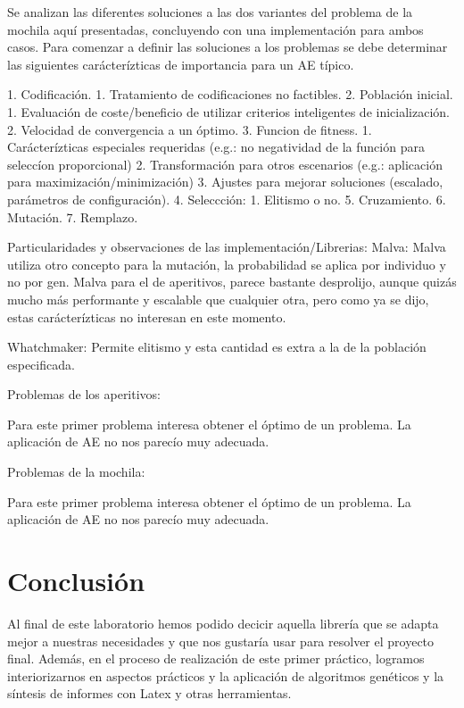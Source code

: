 \documentclass[9pt,conference]{IEEEtran}
\begin{document}
	Se analizan las diferentes soluciones a las dos variantes del problema de la mochila aquí presentadas, concluyendo con una implementación para ambos casos.
	Para comenzar a definir las soluciones a los problemas se debe determinar las siguientes carácterízticas de importancia para un AE típico.

	1. Codificación.
		1. Tratamiento de codificaciones no factibles.
	2. Población inicial.
		1. Evaluación de coste/beneficio de utilizar criterios inteligentes de inicialización.
		2. Velocidad de convergencia a un óptimo.
	3. Funcion de fitness.
		1. Carácterízticas especiales requeridas (e.g.: no negatividad de la función para seleccíon proporcional)
		2. Transformación para otros escenarios (e.g.: aplicación para maximización/minimización)
		3. Ajustes para mejorar soluciones (escalado, parámetros de configuración).
	4. Seleccción:
		1. Elitismo o no.
	5. Cruzamiento.
	6. Mutación.
	7. Remplazo.


	Particularidades y observaciones de las implementación/Librerias:
	Malva:
		Malva utiliza otro concepto para la mutación, la probabilidad se aplica por individuo y no por gen.
		Malva para el de aperitivos, parece bastante desprolijo, aunque quizás mucho más performante y escalable que cualquier otra, pero como ya se dijo, estas carácterízticas no interesan en este momento.

	Whatchmaker:
		Permite elitismo y esta cantidad es extra a la de la población especificada.


	Problemas de los aperitivos:

	Para este primer problema interesa obtener el óptimo de un problema. La aplicación de AE no nos parecío muy adecuada.


	Problemas de la mochila:

	Para este primer problema interesa obtener el óptimo de un problema. La aplicación de AE no nos parecío muy adecuada.






	\section{Conclusi\'on}
	Al final de este laboratorio hemos podido decicir aquella librería que se adapta mejor a nuestras necesidades y que nos gustaría usar para resolver el proyecto final. Además, en el proceso de realización de este primer práctico, logramos interiorizarnos en aspectos prácticos y la aplicación de algoritmos genéticos y la síntesis de informes con Latex y otras herramientas.



	
	{}
\end{document}
